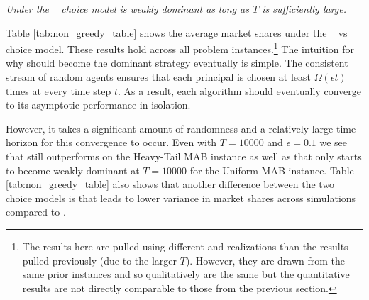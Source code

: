 \documentclass[../competing_bandits.tex]{subfiles}
\begin{document}
\normalsize


\begin{finding}\label{find:non_greedy_choice}
\textit{Under the \HMR~ choice model \TS is weakly dominant as long as $T$ is sufficiently large. }
\end{finding}



Table \ref{tab:non_greedy_table} shows the average market shares under
the \HM~ vs \HMR~ choice model.  These results hold across all problem
instances.\footnote{The results here are pulled using different \MRV
  and realizations than the results pulled previously (due to the
  larger $T$). However, they are drawn from the same prior instances
  and so qualitatively are the same but the quantitative results are
  not directly comparable to those from the previous
  section.} The intuition for why \TS
should become the dominant strategy eventually is simple. The
consistent stream of random agents ensures that each principal is
chosen at least $\Omega(\epsilon t)$ times at every time step $t$. As
a result, each algorithm should eventually converge to its asymptotic
performance in isolation.

However, it takes a significant amount of randomness and a relatively large time horizon for this convergence to occur. Even with $T = 10000$ and $\epsilon = 0.1$ we see that \DEG still outperforms \DG on the Heavy-Tail MAB instance as well as that \TS only starts to become weakly dominant at $T = 10000$ for the Uniform MAB instance. Table \ref{tab:non_greedy_table} also shows that another difference between the two choice models is that \HMR leads to lower variance in market shares across simulations compared to \HM.

\end{document}
